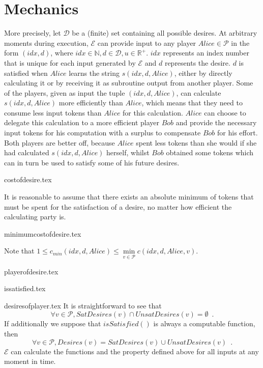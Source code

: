 \section{Mechanics}
  More precisely, let $\mathcal{D}$ be a (finite) set containing all possible desires. At arbitrary moments during execution,
  $\mathcal{E}$ can provide input to any player $Alice \in \mathcal{P}$ in the form $\left(idx, d\right)$, where $idx \in
  \mathbb{N}, d \in \mathcal{D}, u \in \mathbb{R}^{+}$. $idx$ represents an index number that is unique for each input
  generated by $\mathcal{E}$ and $d$ represents the desire. $d$ is satisfied when $Alice$ learns the string $s\left(idx, d,
  Alice\right)$, either by directly calculating it or by receiving it as subroutine output from another player. Some of the
  players, given as input the tuple $\left(idx, d, Alice\right)$, can calculate $s\left(idx, d, Alice\right)$ more efficiently
  than $Alice$, which means that they need to consume less input tokens than $Alice$ for this calculation. $Alice$ can choose
  to delegate this calculation to a more efficient player $Bob$ and provide the necessary input tokens for his computation with
  a surplus to compensate $Bob$ for his effort. Both players are better off, because $Alice$ spent less tokens than she would
  if she had calculated $s\left(idx, d, Alice\right)$ herself, whilst $Bob$ obtained some tokens which can in turn be used to
  satisfy some of his future desires.
 
  {costofdesire.tex}

  It is reasonable to assume that there exists an absolute minimum of tokens that must be spent for the satisfaction of a
  desire, no matter how efficient the calculating party is.

  {minimumcostofdesire.tex}

  \noindent Note that $1 \leq c_{min}\left(idx, d, Alice\right) \leq \min\limits_{v \in \mathcal{P}}{c\left(idx, d, Alice,
  v\right)}$.

  {playerofdesire.tex}

  {issatisfied.tex}

  {desiresofplayer.tex}
  It is straightforward to see that
  \begin{equation*}
    \forall v \in \mathcal{P}, SatDesires\left(v\right) \cap UnsatDesires\left(v\right) = \emptyset \enspace.
  \end{equation*}
  If additionally we suppose that $isSatisfied\left(\right)$ is always a computable function, then
  \begin{equation*}
    \forall v \in \mathcal{P}, Desires\left(v\right) = SatDesires\left(v\right) \cup UnsatDesires\left(v\right) \enspace.
  \end{equation*}
  $\mathcal{E}$ can calculate the functions and the property defined above for all inputs at any moment in time.

